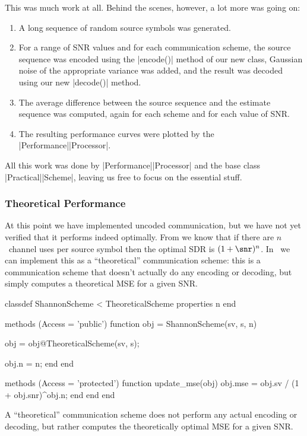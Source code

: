 This was much work at all. Behind the scenes, however, a lot more was going on:
\begin{enumerate}
  \item A long sequence of random source symbols was generated.
  \item For a range of SNR values and for each communication scheme, the source
    sequence was encoded using the |encode()| method of our new class,
    Gaussian noise of the appropriate variance was added, and the result was
    decoded using our new |decode()| method.
  \item The average difference between the source sequence and the estimate
    sequence was computed, again for each scheme and for each value of SNR. 
  \item The resulting performance curves were plotted by the
    |Performance|\-|Processor|.
\end{enumerate}
All this work was done by |Performance|\-|Processor| and the base class
|Practical|\-|Scheme|, leaving us free to focus on the essential stuff.


\subsubsection{Theoretical Performance}

At this point we have implemented uncoded communication, but we have not
yet verified that it performs indeed optimally. From  we know
that if there are $n$~channel uses per source symbol then the optimal SDR
is $(1 + \snr)^n$. In \jscsim\ we can implement this as a ``theoretical''
communication scheme: this is a communication scheme that doesn't actually do
any encoding or decoding, but simply computes a theoretical MSE for a 
given SNR.

\begin{listing}
\begin{Code}
  classdef ShannonScheme < TheoreticalScheme
    properties
      n         %
    end

    methods (Access = 'public')
      function obj = ShannonScheme(sv, s, n)
        
        obj = obj@TheoreticalScheme(sv, s);

        obj.n = n;
      end
    end

    methods (Access = 'protected')
      function update_mse(obj)
          obj.mse = obj.sv / (1 + obj.snr)^obj.n;
      end
    end
  end
\end{Code}
  \caption{A ``theoretical'' communication scheme does not perform any
  actual encoding or decoding, but rather computes the theoretically optimal MSE
  for a given SNR.}
  \label{lst:shannonscheme}
\end{listing}

